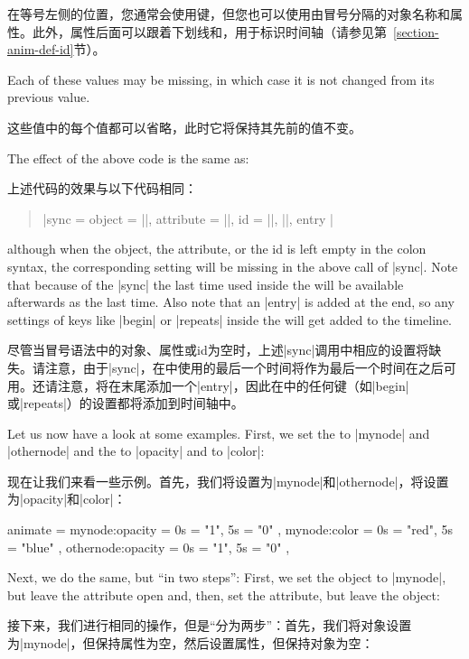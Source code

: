 在等号左侧的位置，您通常会使用键，但您也可以使用由冒号分隔的对象名称和属性。此外，属性后面可以跟着下划线和，用于标识时间轴（请参见第~\ref{section-anim-def-id}节）。

Each of these values may be missing, in which case it is not changed from its
previous value.

这些值中的每个值都可以省略，此时它将保持其先前的值不变。

The effect of the above code is the same as:

上述代码的效果与以下代码相同：

%
\begin{quote}
  \normalfont
  |sync = { object = ||, attribute = ||, id = ||, ||, entry }|
\end{quote}
%
although when the object, the attribute, or the id is left empty in the colon
syntax, the corresponding setting will be missing in the above call of |sync|.
Note that because of the |sync| the last time used inside the 
will be available afterwards as the last time. Also note that an |entry| is
added at the end, so any settings of keys like |begin| or |repeats| inside the
 will get added to the timeline.

尽管当冒号语法中的对象、属性或id为空时，上述|sync|调用中相应的设置将缺失。请注意，由于|sync|，在中使用的最后一个时间将作为最后一个时间在之后可用。还请注意，将在末尾添加一个|entry|，因此在中的任何键（如|begin|或|repeats|）的设置都将添加到时间轴中。

Let us now have a look at some examples. First, we set the 
to |mynode| and |othernode| and the  to |opacity| and to
|color|:

现在让我们来看一些示例。首先，我们将设置为|mynode|和|othernode|，将设置为|opacity|和|color|：

%
\begin{codeexample}
animate = {
  mynode:opacity    = { 0s = "1",   5s = "0" },
  mynode:color      = { 0s = "red", 5s = "blue" },
  othernode:opacity = { 0s = "1",   5s = "0" },
}
\end{codeexample}

Next, we do the same, but ``in two steps'': First, we set the object to
|mynode|, but leave the attribute open and, then, set the attribute, but leave
the object:

接下来，我们进行相同的操作，但是“分为两步”：首先，我们将对象设置为|mynode|，但保持属性为空，然后设置属性，但保持对象为空：


